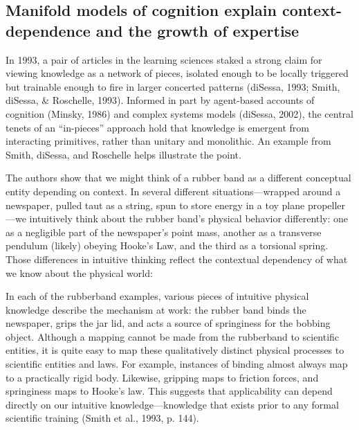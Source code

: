 \subsection{Manifold models of cognition explain context-dependence
and the growth of
expertise}\label{manifold-models-of-cognition-explain-context-dependence-and-the-growth-of-expertise}

In 1993, a pair of articles in the learning sciences staked a strong
claim for viewing knowledge as a network of pieces, isolated enough to
be locally triggered but trainable enough to fire in larger concerted
patterns (diSessa, 1993; Smith, diSessa, \& Roschelle, 1993). Informed
in part by agent-based accounts of cognition (Minsky, 1986) and complex
systems models (diSessa, 2002), the central tenets of an ``in-pieces''
approach hold that knowledge is emergent from interacting primitives,
rather than unitary and monolithic. An example from Smith, diSessa, and
Roschelle helps illustrate the point.

The authors show that we might think of a rubber band as a different
conceptual entity depending on context. In several different
situations---wrapped around a newspaper, pulled taut as a string, spun
to store energy in a toy plane propeller---we intuitively think about
the rubber band's physical behavior differently: one as a negligible
part of the newspaper's point mass, another as a transverse pendulum
(likely) obeying Hooke's Law, and the third as a torsional spring. Those
differences in intuitive thinking reflect the contextual dependency of
what we know about the physical world:

In each of the rubberband examples, various pieces of intuitive physical
knowledge describe the mechanism at work: the rubber band binds the
newspaper, grips the jar lid, and acts a source of springiness for the
bobbing object. Although a mapping cannot be made from the rubberband to
scientific entities, it is quite easy to map these qualitatively
distinct physical processes to scientific entities and laws. For
example, instances of binding almost always map to a practically rigid
body. Likewise, gripping maps to friction forces, and springiness maps
to Hooke's law. This suggests that applicability can depend directly on
our intuitive knowledge---knowledge that exists prior to any formal
scientific training (Smith et al., 1993, p. 144).

